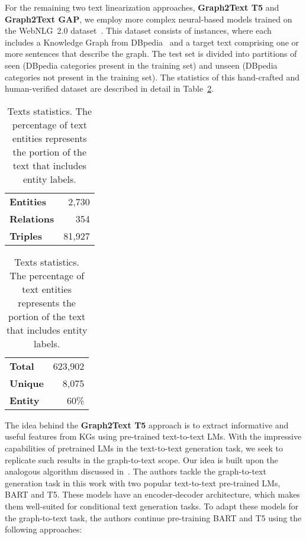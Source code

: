 For the remaining two text linearization approaches, \textbf{Graph2Text T5} and \textbf{Graph2Text GAP}, we employ more complex neural-based models trained on the WebNLG~2.0 dataset~\cite{DBLP:conf/acl/GardentSNP17}. This dataset consists of instances, where each includes a Knowledge Graph from DBpedia~\cite{DBLP:conf/semweb/AuerBKLCI07} and a target text comprising one or more sentences that describe the graph. The test set is divided into partitions of seen (DBpedia categories present in the training set) and unseen (DBpedia categories not present in the training set). The statistics of this hand-crafted and human-verified dataset are described in detail in Table~\ref{tab:methods_kg_path_fusion:webnlg_label}. 

\begin{table}
    \centering
    \caption{Statistics of the WebNLG 2.0 parallel knowledge graph-to-text dataset.}
    
    \begin{subtable}[t]{0.48\textwidth}
    \centering
    \begin{tabular}{lr}
        \toprule
        \textbf{Entities} & 2,730 \\
        \textbf{Relations} & 354 \\
        \textbf{Triples} & 81,927 \\
        \bottomrule
    \end{tabular}
    \caption{Knowledge Graph statistics. Total number of KG components, number of tokens in the narratives.}
    \label{tab:kg_stats}
    \end{subtable}
    \hfill
    \begin{subtable}[t]{0.48\textwidth}
    \centering
    \begin{tabular}{lr}
        \toprule
        \textbf{Total} & 623,902 \\
        \textbf{Unique} & 8,075 \\
        \textbf{Entity} & 60\% \\
        \bottomrule
    \end{tabular}
    \caption{Texts statistics. The percentage of text entities represents the portion of the text that includes entity labels.}
    \label{tab:methods_kg_path_fusion:webnlg_label}
    \end{subtable}
\end{table}

The idea behind the \textbf{Graph2Text T5} approach is to extract informative and useful features from KGs using pre-trained text-to-text LMs. With the impressive capabilities of pretrained LMs in the text-to-text generation task, we seek to replicate such results in the graph-to-text scope. Our idea is built upon the analogous algorithm discussed in~\cite{DBLP:journals/corr/abs-2007-08426}. The authors tackle the graph-to-text generation task in this work with two popular text-to-text pre-trained LMs, BART and T5. These models have an encoder-decoder architecture, which makes them well-suited for conditional text generation tasks. To adapt these models for the graph-to-text task, the authors continue pre-training BART and T5 using the following approaches:

